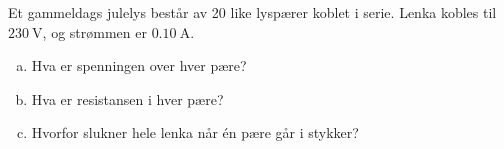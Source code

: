 %
Et gammeldags julelys består av 20 like lyspærer koblet i serie. Lenka kobles til $\SI{230}{\volt}$, og strømmen er $\SI{0.10}{\ampere}$.
\begin{enumerate}[a)]
    \item Hva er spenningen over hver pære?
    \item Hva er resistansen i hver pære?
    \item Hvorfor slukner hele lenka når én pære går i stykker?
\end{enumerate}
%
